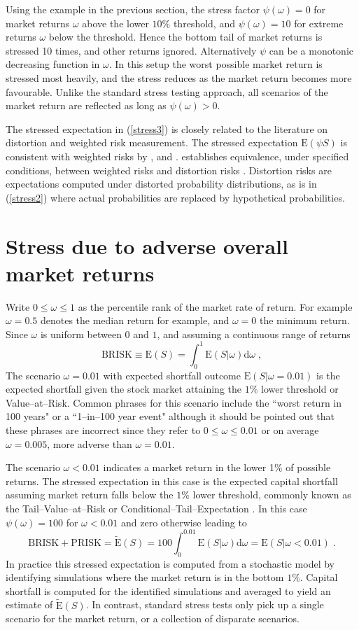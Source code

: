 \documentclass[authoryear]{elsarticle}
\newcommand{\E}{{\mathrm E}}
\newcommand{\de}{\mathrm{d}}
\newcommand{\eref}[1]{(\ref{#1})}
\newcommand{\br}{\ensuremath{\mathrm{BRISK}}}
\newcommand{\pr}{\ensuremath{\mathrm{PRISK}}}
\begin{document}
Using the example in the previous section, the stress factor $\psi(\omega)=0$ for market returns $\omega$ above the lower $10\%$ threshold, and $\psi(\omega)=10$ for extreme returns $\omega$ below the threshold. Hence the bottom tail of market returns is stressed 10 times, and  other returns  ignored. Alternatively $\psi$ can be a monotonic decreasing  function in $\omega$. In this setup the worst possible market return is stressed most heavily, and the stress reduces as the market return becomes more favourable.  Unlike the standard stress testing approach, all scenarios of the market return are reflected as long as $\psi(\omega)>0$.

The stressed expectation in \eref{stress3} is closely related to the literature on distortion and weighted risk measurement. The stressed expectation $\E(\psi S)$ is consistent with weighted risks by \cite{furman2008weighted1}, \cite{choo2009loss} and \cite{choo2010determining}. \cite{choo2009loss} establishes equivalence, under specified conditions, between weighted risks and distortion risks \citep{wang2000class}. Distortion risks are expectations computed under distorted probability distributions, as is in \eref{stress2} where actual probabilities are replaced by hypothetical probabilities.

\section{Stress due to adverse overall market returns}\label{s_stmarket}

 Write $0\le \omega\le 1$ as the percentile rank of the market rate of return. For example $\omega=0.5$ denotes the median return for example, and $\omega=0$  the minimum return. Since $\omega$ is uniform between $0$ and $1$, and assuming a continuous range of returns
 $$
 \br\equiv\E(S) = \int_0^1 \E(S|\omega) \de \omega\;,
$$
The scenario $\omega=0.01$ with expected shortfall outcome $\E(S|\omega=0.01)$ is the expected shortfall given the stock market attaining the $1\%$ lower threshold or Value--at--Risk. Common phrases for this scenario include the ``worst return in 100 years" or a ``1--in--100 year event" although it should be pointed out that these phrases are incorrect since they refer to $0\le \omega\le 0.01$ or on average $\omega=0.005$, more adverse than $\omega=0.01$.   

The scenario $\omega<0.01$ indicates a market return in the lower 1\% of possible returns. The stressed expectation in this case is the expected capital shortfall assuming market return falls below the $1\%$ lower threshold, commonly known as the Tail--Value--at--Risk or Conditional--Tail--Expectation \citep{mcneil2005qrm}.  In this case $\psi(\omega)=100$ for $\omega<0.01$ and zero otherwise leading to
$$
\br+\pr=\widetilde \E(S)  = 100\int_0^{0.01}\E(S|\omega) \de \omega 
= \E(S|\omega<0.01) \;.
$$
In practice this stressed expectation is computed from a stochastic model by identifying simulations where the market return is in the bottom $1\%$. Capital shortfall is computed for the identified simulations and averaged to yield an estimate of $\widetilde \E(S)$. In contrast, standard stress tests only pick up a single scenario for the market return, or a collection of disparate scenarios.
\end{document}
